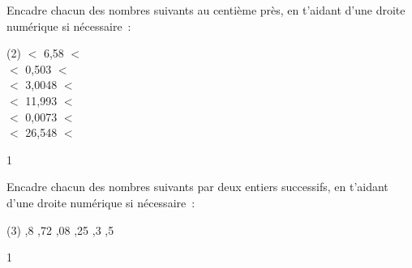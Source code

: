 \documentclass[a4paper,11pt]{report}
\begin{document}
\begin{exop}{
Encadre chacun des nombres suivants au centième près, en t'aidant d'une droite numérique si nécessaire~:
\begin{tasks}[after-item-skip = 0.15em, after-skip=-2em](2)
\task \makebox[.7in]{\hrulefill} $<$ 6,58 $<$ \makebox[.7in]{\hrulefill}\\
\task \makebox[.7in]{\hrulefill} $<$ 0,503 $<$ \makebox[.7in]{\hrulefill}\\
\task \makebox[.7in]{\hrulefill} $<$ 3,0048 $<$ \makebox[.7in]{\hrulefill}\\
\task \makebox[.7in]{\hrulefill} $<$ 11,993 $<$ \makebox[.7in]{\hrulefill}\\
\task \makebox[.7in]{\hrulefill} $<$ 0,0073 $<$ \makebox[.7in]{\hrulefill}\\
\task \makebox[.7in]{\hrulefill} $<$ 26,548 $<$ \makebox[.7in]{\hrulefill}\\
\end{tasks}
}{1}\end{exop}


\begin{exo}{
Encadre chacun des nombres suivants par deux entiers successifs, en t'aidant d'une droite numérique si nécessaire~:
\begin{tasks}[after-item-skip = 0.2em, after-skip=-0.5em](3)
,8
,72
,08
,25
,3
,5
\end{tasks}
}{1}\end{exo}
\end{document}
